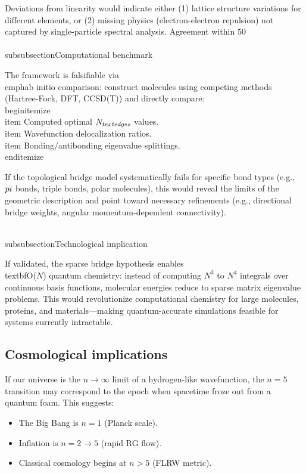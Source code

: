 \documentclass[aps,prd,twocolumn,superscriptaddress,groupedaddress,showpacs]{revtex4-2}
\begin{document}
Deviations from linearity would indicate either (1) lattice structure variations for different elements, or (2) missing physics (electron-electron repulsion) not captured by single-particle spectral analysis. Agreement within 50\\%

\\subsubsection{Computational benchmark}

The framework is falsifiable via \\emph{ab initio} comparison: construct molecules using competing methods (Hartree-Fock, DFT, CCSD(T)) and directly compare:
\\begin{itemize}
\\item Computed optimal $N_{\\text{edges}}$ values.
\\item Wavefunction delocalization ratios.
\\item Bonding/antibonding eigenvalue splittings.
\\end{itemize}

If the topological bridge model systematically fails for specific bond types (e.g., $\\pi$ bonds, triple bonds, polar molecules), this would reveal the limits of the geometric description and point toward necessary refinements (e.g., directional bridge weights, angular momentum-dependent connectivity).

\\subsubsection{Technological implication}

If validated, the sparse bridge hypothesis enables \\textbf{O($N$) quantum chemistry}: instead of computing $N^3$ to $N^4$ integrals over continuous basis functions, molecular energies reduce to sparse matrix eigenvalue problems. This would revolutionize computational chemistry for large molecules, proteins, and materials---making quantum-accurate simulations feasible for systems currently intractable.

\subsection{Cosmological implications}

If our universe is the $n \to \infty$ limit of a hydrogen-like wavefunction, the $n=5$ transition may correspond to the epoch when spacetime froze out from a quantum foam. This suggests:
\begin{itemize}
\item The Big Bang is $n=1$ (Planck scale).
\item Inflation is $n=2 \to 5$ (rapid RG flow).
\item Classical cosmology begins at $n > 5$ (FLRW metric).
\end{itemize}
\end{document}
